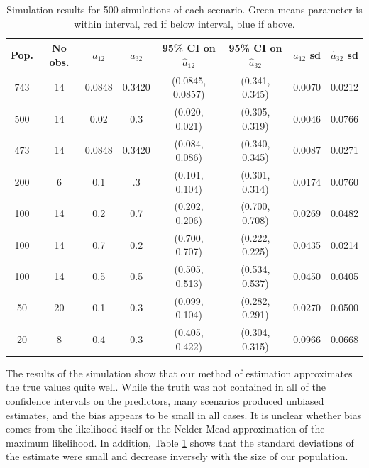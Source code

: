 \documentclass{svproc}
\begin{document}
\begin{table}
\centering
\setlength{\tabcolsep}{5pt}

\begin{tabular}{|c|c|c|c|c|c|c|c|}
\hline
Pop. & No obs. & $a_{12}$ & $a_{32}$ & 95\% CI on $\hat{a}_{12}$ & 95\% CI on $\hat{a}_{32}$ & $\hat{a}_{12}$ sd &$\hat{a}_{32}$ sd  \\ \hline 
743 & 14 & 0.0848 & 0.3420 &\cellcolor{green!25}(0.0845, 0.0857) & \cellcolor{green!25}(0.341, 0.345) & 0.0070 & 0.0212 \\ \hline
500 & 14 & 0.02 &0.3 & \cellcolor{red!25} (0.020, 0.021) &\cellcolor{red!25}  (0.305, 0.319) &0.0046 &0.0766 \\ \hline
473 & 14 & 0.0848 & 0.3420 &\cellcolor{green!25} (0.084, 0.086) & \cellcolor{green!25}(0.340, 0.345) &0.0087 & 0.0271\\ \hline
200 & 6 & 0.1 &.3 &\cellcolor{red!25} (0.101, 0.104)&\cellcolor{red!25}  (0.301, 0.314)&0.0174 & 0.0760\\ \hline 
100 & 14 & 0.2 & 0.7 &\cellcolor{red!25} (0.202, 0.206) & \cellcolor{green!25}(0.700, 0.708) & 0.0269 &0.0482 \\ \hline
100 & 14 & 0.7 & 0.2 &\cellcolor{green!25}(0.700, 0.707) & \cellcolor{red!25} (0.222, 0.225) & 0.0435 & 0.0214 \\ \hline
100 & 14 &0.5 &0.5 &\cellcolor{red!25} (0.505, 0.513) &\cellcolor{red!25} (0.534, 0.537)&0.0450 & 0.0405\\ \hline

50 & 20 & 0.1 &0.3 &\cellcolor{green!25}(0.099, 0.104) & \cellcolor{blue!25} (0.282, 0.291) & 0.0270 & 0.0500\\ \hline

20 & 8 & 0.4 & 0.3 & \cellcolor{red!25} (0.405, 0.422) & \cellcolor{red!25} (0.304, 0.315)& 0.0966 & 0.0668\\ \hline



\end{tabular}
\caption{Simulation results for 500 simulations of each scenario. Green means parameter is within interval, red if below interval, blue if above. }
\label{tab1}
\end{table}

The results of the simulation show that our method of estimation approximates the true values quite well. While the truth was not contained in all of the confidence intervals on the predictors, many scenarios produced unbiased estimates, and the bias appears to be small in all cases. It is unclear whether bias comes from the likelihood itself or the Nelder-Mead approximation of the maximum likelihood. In addition, Table \ref{tab1} shows that the standard deviations of the estimate were small and decrease inversely with the size of our population. 
\end{document}
